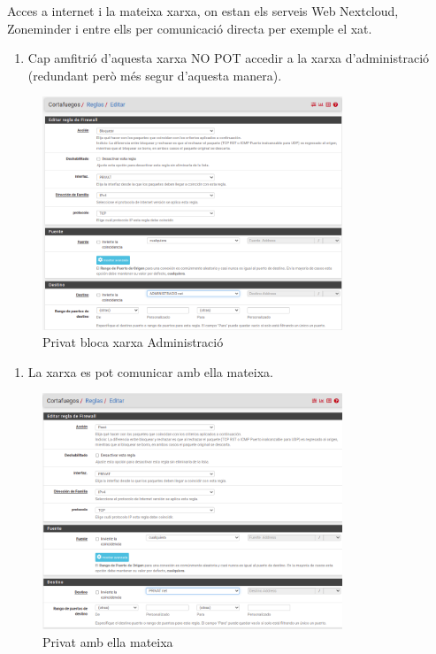 \documentclass[
  10pt,
]{krantz}
\providecommand{\tightlist}{%
  \setlength{\itemsep}{0pt}\setlength{\parskip}{0pt}}
\begin{document}
Acces a internet i la mateixa xarxa, on estan els serveis Web Nextcloud, Zoneminder i entre ells per comunicació directa per exemple el xat.

\begin{enumerate}
\def\labelenumi{\arabic{enumi}.}
\tightlist
\item
  Cap amfitrió d'aquesta xarxa NO POT accedir a la xarxa d'administració (redundant però més segur d'aquesta manera).
\end{enumerate}

\begin{figure}
\centering
\includegraphics[width=0.8\textwidth,height=\textheight]{imatges/proxmox/regla_privat1.png}
\caption{Privat bloca xarxa Administració}
\end{figure}

\begin{enumerate}
\def\labelenumi{\arabic{enumi}.}
\setcounter{enumi}{1}
\tightlist
\item
  La xarxa es pot comunicar amb ella mateixa.
\end{enumerate}

\begin{figure}
\centering
\includegraphics[width=0.8\textwidth,height=\textheight]{imatges/proxmox/regla_privat2.png}
\caption{Privat amb ella mateixa}
\end{figure}
\end{document}
